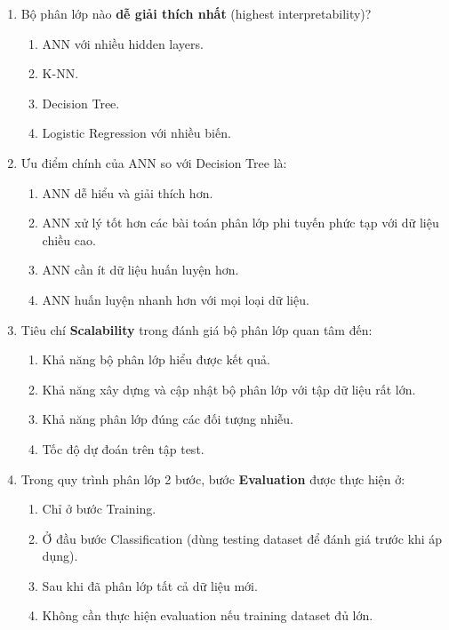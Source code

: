 \documentclass[10pt]{article}
\begin{document}
\begin{enumerate}[leftmargin=*, label=\textbf{Câu \arabic*.}]
    \item Bộ phân lớp nào \textbf{dễ giải thích nhất} (highest interpretability)?
    \begin{enumerate}[label=\Alph*.]
        \item ANN với nhiều hidden layers.
        \item K-NN.
        \item Decision Tree.
        \item Logistic Regression với nhiều biến.
    \end{enumerate}

    \item Ưu điểm chính của ANN so với Decision Tree là:
    \begin{enumerate}[label=\Alph*.]
        \item ANN dễ hiểu và giải thích hơn.
        \item ANN xử lý tốt hơn các bài toán phân lớp phi tuyến phức tạp với dữ liệu chiều cao.
        \item ANN cần ít dữ liệu huấn luyện hơn.
        \item ANN huấn luyện nhanh hơn với mọi loại dữ liệu.
    \end{enumerate}

    \item Tiêu chí \textbf{Scalability} trong đánh giá bộ phân lớp quan tâm đến:
    \begin{enumerate}[label=\Alph*.]
        \item Khả năng bộ phân lớp hiểu được kết quả.
        \item Khả năng xây dựng và cập nhật bộ phân lớp với tập dữ liệu rất lớn.
        \item Khả năng phân lớp đúng các đối tượng nhiễu.
        \item Tốc độ dự đoán trên tập test.
    \end{enumerate}

    \item Trong quy trình phân lớp 2 bước, bước \textbf{Evaluation} được thực hiện ở:
    \begin{enumerate}[label=\Alph*.]
        \item Chỉ ở bước Training.
        \item Ở đầu bước Classification (dùng testing dataset để đánh giá trước khi áp dụng).
        \item Sau khi đã phân lớp tất cả dữ liệu mới.
        \item Không cần thực hiện evaluation nếu training dataset đủ lớn.
    \end{enumerate}


\end{enumerate}
\end{document}
